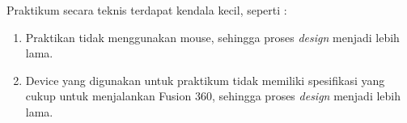 Praktikum secara teknis terdapat kendala kecil, seperti :

\begin{enumerate}
    \item Praktikan tidak menggunakan mouse, sehingga proses \textit{design} menjadi lebih lama.
    \item Device yang digunakan untuk praktikum tidak memiliki spesifikasi yang cukup untuk menjalankan Fusion 360, sehingga proses \textit{design} menjadi lebih lama.
\end{enumerate}


\newpage